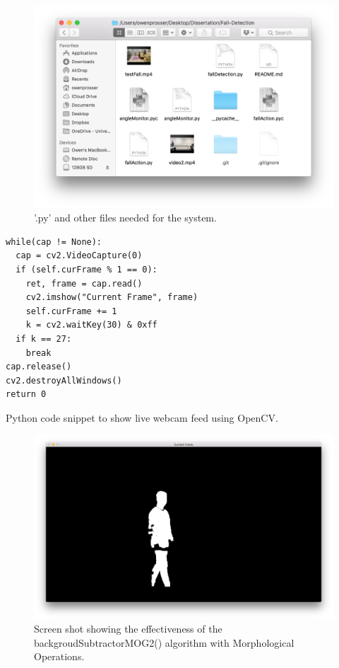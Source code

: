 \documentclass[11pt,a4paper]{report}
\begin{document}
\begin{figure}[H]
 \centering
 \includegraphics[scale = 0.5]{requiredFiles.png}
 \caption{'.py' and other files needed for the system.}
 \label{fig:requiredFiles}
\end{figure}

\begin{listing}
\begin{verbatim}
while(cap != None):
  cap = cv2.VideoCapture(0)
  if (self.curFrame % 1 == 0):
    ret, frame = cap.read()
    cv2.imshow("Current Frame", frame)
    self.curFrame += 1
    k = cv2.waitKey(30) & 0xff
  if k == 27:
  	break
cap.release()
cv2.destroyAllWindows()
return 0
\end{verbatim}
\caption{Python code snippet to show live webcam feed using OpenCV.}
\label{displayInputVideo}
\end{listing}

\begin{figure}[H]
 \centering
 \includegraphics[scale = 0.22]{bgSubExample.png}
 \caption{Screen shot showing the effectiveness of the backgroudSubtractorMOG2() algorithm with Morphological Operations.}
 \label{fig:backgroundSub}
\end{figure}
\end{document}

